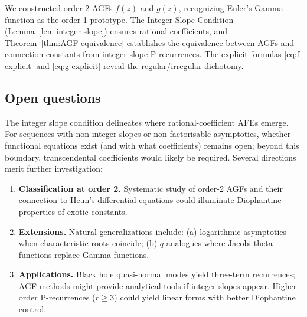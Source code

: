 \documentclass[11pt,reqno]{amsart}
\theoremstyle{definition}
\numberwithin{equation}{section}
\begin{document}
We constructed order-2 AGFs $f(z)$ and $g(z)$, recognizing Euler's Gamma function as the order-1 prototype. The Integer Slope Condition (Lemma~\ref{lem:integer-slope}) ensures rational coefficients, and Theorem~\ref{thm:AGF-equivalence} establishes the equivalence between AGFs and connection constants from integer-slope P-recurrences. The explicit formulas \eqref{eq:f-explicit} and \eqref{eq:g-explicit} reveal the regular/irregular dichotomy.

\subsection{Open questions}

The integer slope condition delineates where rational-coefficient AFEs emerge. For sequences with non-integer slopes or non-factorisable asymptotics, whether functional equations exist (and with what coefficients) remains open; beyond this boundary, transcendental coefficients would likely be required. Several directions merit further investigation:

\begin{enumerate}
\item \textbf{Classification at order 2.} Systematic study of order-2 AGFs and their connection to Heun's differential equations \cite{Ronveaux1995} could illuminate Diophantine properties of exotic constants.

\item \textbf{Extensions.} Natural generalizations include: (a) logarithmic asymptotics when characteristic roots coincide; (b) $q$-analogues where Jacobi theta functions replace Gamma functions.

\item \textbf{Applications.} Black hole quasi-normal modes \cite{Leaver1985} yield three-term recurrences; AGF methods might provide analytical tools if integer slopes appear. Higher-order P-recurrences ($r \geq 3$) could yield linear forms with better Diophantine control.
\end{enumerate}
\end{document}

